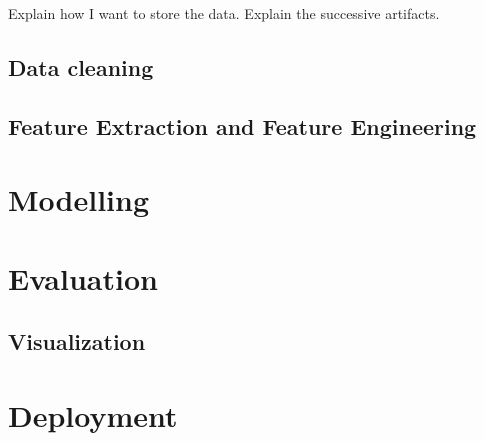 Explain how I want to store the data. Explain the successive artifacts.

\subsection{Data cleaning}


\subsection{Feature Extraction and Feature Engineering}

\section{Modelling}
\section{Evaluation}
\subsection{Visualization}
\section{Deployment}